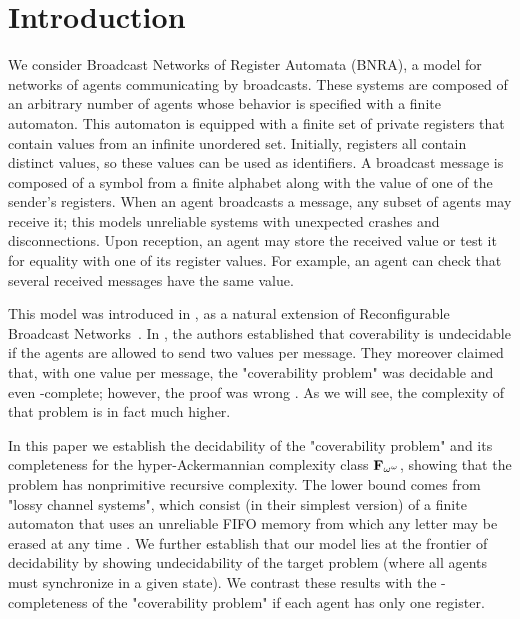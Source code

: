 \section{Introduction}
We consider Broadcast Networks of Register Automata (BNRA), a model for networks of agents communicating by broadcasts. These systems are composed of an arbitrary number of agents whose behavior is specified with a finite automaton. This automaton is equipped with a finite set of private registers that contain values from an infinite unordered set. Initially, registers all contain distinct values, so these values can be used as identifiers. 
A broadcast message is composed of a symbol from a finite alphabet along with the value of one of the sender's registers. When an agent broadcasts a message, any subset of agents may receive it; this models unreliable systems with unexpected crashes and disconnections. Upon reception, an agent may store the received value or test it for equality with one of its register values. For example, an agent can check that several received messages have the same value.

This model was introduced in \cite{DelzannoST13}, as a natural extension of Reconfigurable Broadcast Networks~\cite{DelzannoSZ2010Adhoc}. In \cite{DelzannoST13}, the authors established that coverability is undecidable if the agents are allowed to send two values per message. They moreover claimed that, with one value per message, the "coverability problem" was decidable and even \PSPACE-complete; however, the proof was wrong \cite{ArnaudErratum}. As we will see, the complexity of that problem is in fact much higher.

In this paper we establish the decidability of the "coverability problem" and its completeness for the hyper-Ackermannian complexity class $\mathbf{F}_{\omega^\omega}$, showing that the problem has nonprimitive recursive complexity. The lower bound comes from "lossy channel systems", which consist (in their simplest version) of a finite automaton that uses an unreliable FIFO memory from which any letter may be erased at any time \cite{AbdullaJ1996verif, Schnoebelen2002verifying,ChambartS08ordinal}. 
We further establish that our model lies at the frontier of decidability by showing undecidability of the target problem (where all agents must synchronize in a given state). We contrast these results with the \NP-completeness of the "coverability problem" if each agent has only one register. 

